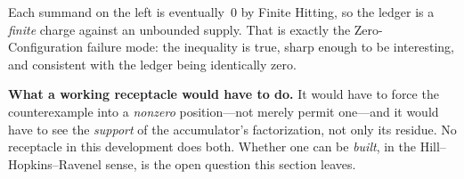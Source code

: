\noindent
Each summand on the left is eventually~$0$ by Finite Hitting, so the
ledger is a \emph{finite} charge against an unbounded supply.  That is
exactly the Zero-Configuration failure mode: the inequality is true,
sharp enough to be interesting, and consistent with the ledger being
identically zero.

\begin{frontierbox}
\textbf{What a working receptacle would have to do.}  It would have to
force the counterexample into a \emph{nonzero} position---not merely
permit one---and it would have to see the \emph{support} of the
accumulator's factorization, not only its residue.  No receptacle in
this development does both.  Whether one can be \emph{built}, in the
Hill--Hopkins--Ravenel sense, is the open question this section
leaves.
\end{frontierbox}
